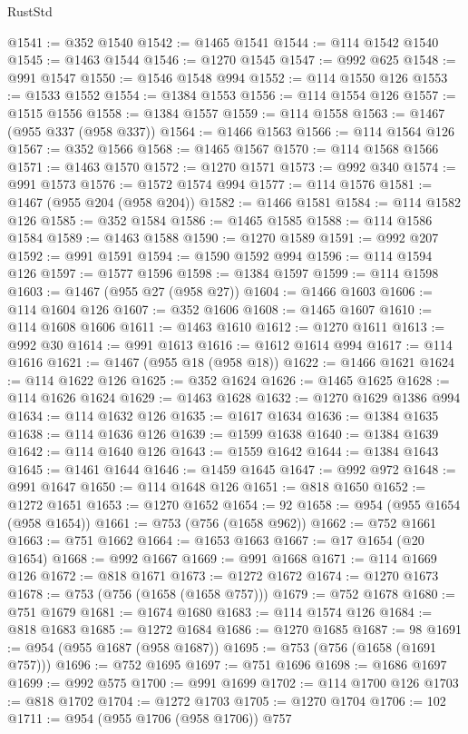 \begin{lexlean}{RustStd}
\begin{coremodule}
@1541 := @352 @1540
@1542 := @1465 @1541
@1544 := @114 @1542 @1540
@1545 := @1463 @1544
@1546 := @1270 @1545
@1547 := @992 @625
@1548 := @991 @1547
@1550 := @1546 @1548 @994
@1552 := @114 @1550 @126
@1553 := @1533 @1552
@1554 := @1384 @1553
@1556 := @114 @1554 @126
@1557 := @1515 @1556
@1558 := @1384 @1557
@1559 := @114 @1558
@1563 := @1467 (@955 @337 (@958 @337))
@1564 := @1466 @1563
@1566 := @114 @1564 @126
@1567 := @352 @1566
@1568 := @1465 @1567
@1570 := @114 @1568 @1566
@1571 := @1463 @1570
@1572 := @1270 @1571
@1573 := @992 @340
@1574 := @991 @1573
@1576 := @1572 @1574 @994
@1577 := @114 @1576
@1581 := @1467 (@955 @204 (@958 @204))
@1582 := @1466 @1581
@1584 := @114 @1582 @126
@1585 := @352 @1584
@1586 := @1465 @1585
@1588 := @114 @1586 @1584
@1589 := @1463 @1588
@1590 := @1270 @1589
@1591 := @992 @207
@1592 := @991 @1591
@1594 := @1590 @1592 @994
@1596 := @114 @1594 @126
@1597 := @1577 @1596
@1598 := @1384 @1597
@1599 := @114 @1598
@1603 := @1467 (@955 @27 (@958 @27))
@1604 := @1466 @1603
@1606 := @114 @1604 @126
@1607 := @352 @1606
@1608 := @1465 @1607
@1610 := @114 @1608 @1606
@1611 := @1463 @1610
@1612 := @1270 @1611
@1613 := @992 @30
@1614 := @991 @1613
@1616 := @1612 @1614 @994
@1617 := @114 @1616
@1621 := @1467 (@955 @18 (@958 @18))
@1622 := @1466 @1621
@1624 := @114 @1622 @126
@1625 := @352 @1624
@1626 := @1465 @1625
@1628 := @114 @1626 @1624
@1629 := @1463 @1628
@1632 := @1270 @1629 @1386 @994
@1634 := @114 @1632 @126
@1635 := @1617 @1634
@1636 := @1384 @1635
@1638 := @114 @1636 @126
@1639 := @1599 @1638
@1640 := @1384 @1639
@1642 := @114 @1640 @126
@1643 := @1559 @1642
@1644 := @1384 @1643
@1645 := @1461 @1644
@1646 := @1459 @1645
@1647 := @992 @972
@1648 := @991 @1647
@1650 := @114 @1648 @126
@1651 := @818 @1650
@1652 := @1272 @1651
@1653 := @1270 @1652
@1654 := 92
@1658 := @954 (@955 @1654 (@958 @1654))
@1661 := @753 (@756 (@1658 @962))
@1662 := @752 @1661
@1663 := @751 @1662
@1664 := @1653 @1663
@1667 := @17 @1654 (@20 @1654)
@1668 := @992 @1667
@1669 := @991 @1668
@1671 := @114 @1669 @126
@1672 := @818 @1671
@1673 := @1272 @1672
@1674 := @1270 @1673
@1678 := @753 (@756 (@1658 (@1658 @757)))
@1679 := @752 @1678
@1680 := @751 @1679
@1681 := @1674 @1680
@1683 := @114 @1574 @126
@1684 := @818 @1683
@1685 := @1272 @1684
@1686 := @1270 @1685
@1687 := 98
@1691 := @954 (@955 @1687 (@958 @1687))
@1695 := @753 (@756 (@1658 (@1691 @757)))
@1696 := @752 @1695
@1697 := @751 @1696
@1698 := @1686 @1697
@1699 := @992 @575
@1700 := @991 @1699
@1702 := @114 @1700 @126
@1703 := @818 @1702
@1704 := @1272 @1703
@1705 := @1270 @1704
@1706 := 102
@1711 := @954 (@955 @1706 (@958 @1706)) @757

\end{coremodule}
\end{lexlean}
